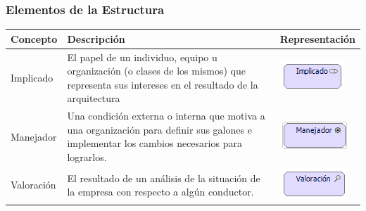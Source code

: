 \subsubsection{Elementos de la Estructura}
\begin{table}[h!]
	\begin{center}
		\begin{tabular}{| m{6em} | m{7cm}| m{3cm} |}
			\hline
			Concepto & Descripción & Representación \\ 
			\hline
			
			Implicado 
			& 
			El papel de un individuo, equipo u organización (o clases de los mismos) que representa sus intereses en el resultado de la arquitectura 
			& \includegraphics[width=0.8\linewidth, height=0.05\textheight]{imgs/Elementos/Implicado.PNG}
			\\
			\hline
			Manejador 
			& 
			Una condición externa o interna que motiva a una organización para definir sus galones e implementar los cambios necesarios para lograrlos. 
			& \includegraphics[width=0.8\linewidth, height=0.05\textheight]{imgs/Elementos/Manejador.PNG}
			\\
			\hline
			Valoración 
			& 
			El resultado de un análisis de la situación de la empresa con respecto a algún conductor. 
			& \includegraphics[width=0.8\linewidth, height=0.05\textheight]{imgs/Elementos/Valoracion.PNG}

\end{tabular}
\end{center}
\end{table}
